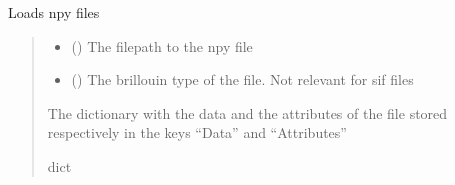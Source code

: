 \documentclass[letterpaper,10pt,english]{sphinxmanual}
\begin{document}
\begin{fulllineitems}
\label{\detokenize{_autosummary/HDF5_BLS.load_data:HDF5_BLS.load_data.load_sif_file}}
\pysigstartsignatures
\pysiglinewithargsret
{}
{\sphinxparamcomma {}\sphinxparamcomma {}}
{}
\pysigstopsignatures
\sphinxAtStartPar
Loads npy files
\begin{quote}\begin{description}
\begin{itemize}
\item {} 
\sphinxAtStartPar
{} () \textendash{} The filepath to the npy file

\item {} 
\sphinxAtStartPar
{} (\sphinxstyleliteralemphasis{\sphinxupquote{, }}) \textendash{} The brillouin type of the file. Not relevant for sif files

\end{itemize}

\sphinxAtStartPar
The dictionary with the data and the attributes of the file stored respectively in the keys “Data” and “Attributes”

\sphinxAtStartPar
dict

\end{description}\end{quote}

\end{fulllineitems}



\renewcommand{\indexname}{Python Module Index}
\begin{sphinxtheindex}
\let\bigletter\sphinxstyleindexlettergroup
\bigletter{h}
\item\relax{}
\item\relax{}
\item\relax{}
\item\relax{}
\end{sphinxtheindex}

\renewcommand{\indexname}{Index}
\printindex
\end{document}
